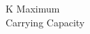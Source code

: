 \documentclass[preview]{standalone}
\begin{document}
\begin{center}
K \rightarrow Maximum\\Carrying Capacity
\end{center}
\end{document}
